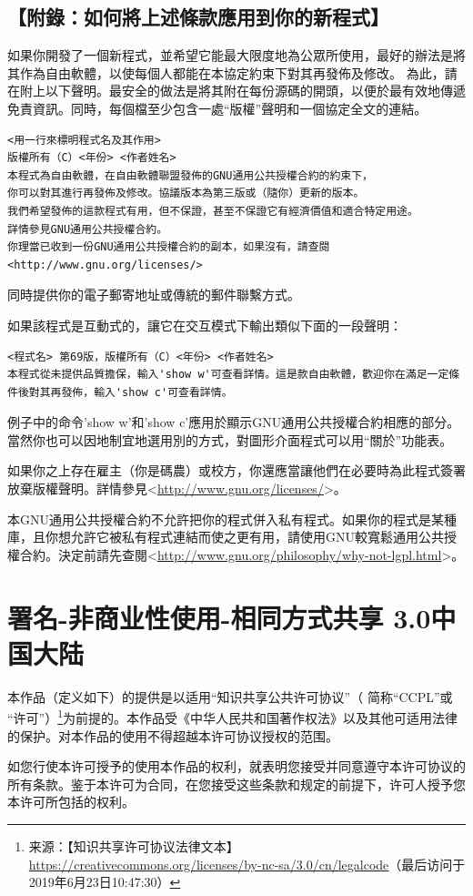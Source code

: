 \subsection{【附錄：如何將上述條款應用到你的新程式】}
如果你開發了一個新程式，並希望它能最大限度地為公眾所使用，最好的辦法是將其作為自由軟體，以使每個人都能在本協定約束下對其再發佈及修改。
為此，請在附上以下聲明。最安全的做法是將其附在每份源碼的開頭，以便於最有效地傳遞免責資訊。同時，每個檔至少包含一處“版權”聲明和一個協定全文的連結。
\begin{verbatim}
<用一行來標明程式名及其作用>
版權所有（C）<年份> <作者姓名>
本程式為自由軟體，在自由軟體聯盟發佈的GNU通用公共授權合約的約束下，
你可以對其進行再發佈及修改。協議版本為第三版或（隨你）更新的版本。
我們希望發佈的這款程式有用，但不保證，甚至不保證它有經濟價值和適合特定用途。
詳情參見GNU通用公共授權合約。
你理當已收到一份GNU通用公共授權合約的副本，如果沒有，請查閱<http://www.gnu.org/licenses/>
\end{verbatim}\par
同時提供你的電子郵寄地址或傳統的郵件聯繫方式。\par
如果該程式是互動式的，讓它在交互模式下輸出類似下面的一段聲明：
\begin{verbatim}
<程式名> 第69版，版權所有（C）<年份> <作者姓名>
本程式從未提供品質擔保，輸入'show w'可查看詳情。這是款自由軟體，歡迎你在滿足一定條件後對其再發佈，輸入'show c'可查看詳情。
\end{verbatim}\par
例子中的命令'show w'和'show c'應用於顯示GNU通用公共授權合約相應的部分。當然你也可以因地制宜地選用別的方式，對圖形介面程式可以用“關於”功能表。\par
如果你之上存在雇主（你是碼農）或校方，你還應當讓他們在必要時為此程式簽署放棄版權聲明。詳情參見<\url{http://www.gnu.org/licenses/}>。\par
本GNU通用公共授權合約不允許把你的程式併入私有程式。如果你的程式是某種庫，且你想允許它被私有程式連結而使之更有用，請使用GNU較寬鬆通用公共授權合約。決定前請先查閱<\url{http://www.gnu.org/philosophy/why-not-lgpl.html}>。 
\section{署名-非商业性使用-相同方式共享 3.0中国大陆}
本作品（定义如下）的提供是以适用“知识共享公共许可协议”（ 简称“CCPL”或 “许可”）\footnote{来源：【知识共享许可协议法律文本】\url{https://creativecommons.org/licenses/by-nc-sa/3.0/cn/legalcode}（最后访问于2019年6月23日10:47:30）}为前提的。本作品受《中华人民共和国著作权法》以及其他可适用法律的保护。对本作品的使用不得超越本许可协议授权的范围。\par
如您行使本许可授予的使用本作品的权利，就表明您接受并同意遵守本许可协议的所有条款。鉴于本许可为合同，在您接受这些条款和规定的前提下，许可人授予您本许可所包括的权利。
